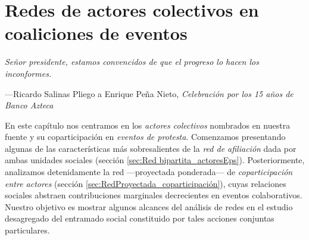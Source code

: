 \documentclass[letterpaper, 11pt]{book}
\theoremstyle{definition}
\theoremstyle{remark}
\begin{document}
\chapter{Redes de actores colectivos en coaliciones de eventos}
\label{chap:ActoresEPS}


\epigraph{\itshape Señor presidente, estamos convencidos de que el progreso lo hacen los inconformes.}{---Ricardo Salinas Pliego a Enrique Peña Nieto, \textit{Celebración por los 15 años de Banco Azteca}}


\begingroup
\small
    En este capítulo nos centramos en los \emph{actores colectivos} nombrados en nuestra fuente y su coparticipación en \emph{eventos de protesta}. 
    Comenzamos presentando algunas de las características más sobresalientes de la \emph{red de afiliación} dada por ambas unidades sociales (sección \ref{sec:Red bipartita_actoresEps}). 
    Posteriormente, analizamos detenidamente la red ---proyectada ponderada--- de \emph{coparticipación entre actores} (sección \ref{sec:RedProyectada_coparticipación}), cuyas relaciones sociales abstraen contribuciones marginales decrecientes en eventos colaborativos. 
    Nuestro objetivo es mostrar algunos alcances del análisis de redes en el estudio desagregado del entramado social constituido por tales acciones conjuntas particulares.
\vspace{2em}
\endgroup
\end{document}
